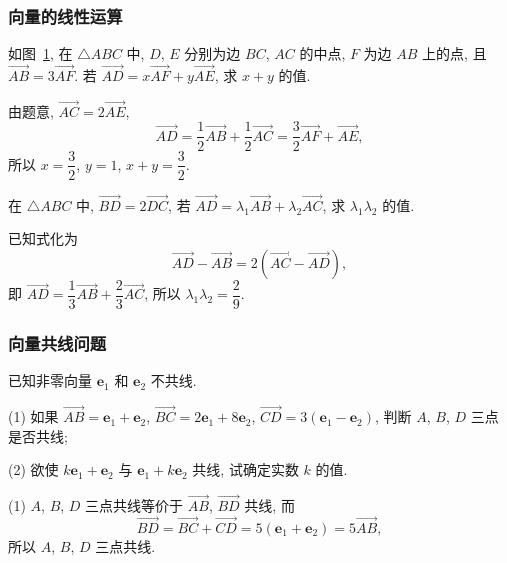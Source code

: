 \subsubsection{向量的线性运算}
\begin{example}
    如图~\ref{fig-190626-1845}, 在 $\triangle ABC$ 中, $D$, $E$ 分别为边 $BC$, $AC$ 的中点, $F$ 为边 $AB$ 上的点, 且 $\overrightarrow{AB} =3\overrightarrow{AF}$. 若 $\overrightarrow{AD}=x \overrightarrow{AF}+y \overrightarrow{AE}$, 求 $x+y$ 的值.
    \begin{figure}[htb]
    \small
    \centering
    \caption{}\label{fig-190626-1845}
    \end{figure}
\end{example}
\beginsolution
    由题意, $\overrightarrow{AC}= 2\overrightarrow{AE}$,
    \[\overrightarrow{AD}
        = \frac12\overrightarrow{AB}+ \frac12\overrightarrow{AC}
        = \frac32\overrightarrow{AF}+ \overrightarrow{AE},\]
    所以 $x=\dfrac32$, $y=1$, $x+y= \dfrac32$.
\endsolution

\lianxi
\begin{exercise}[s]
    在 $\triangle ABC$ 中, $\overrightarrow{BD}=2\overrightarrow{DC}$,
    若 $\overrightarrow{AD}=\lambda_1 \overrightarrow{AB}
      +\lambda_2 \overrightarrow{AC}$, 求 $\lambda_1 \lambda_2$ 的值.
\end{exercise}
\beginsolution
    已知式化为 
    \[\overrightarrow{AD}- \overrightarrow{AB}
        = 2(\overrightarrow{AC}- \overrightarrow{AD}),\]
    即 $\overrightarrow{AD}= \dfrac13\overrightarrow{AB}+ \dfrac23\overrightarrow{AC}$, 所以 $\lambda_1\lambda_2= \dfrac29$. 
\endsolution

\subsubsection{向量共线问题}

\begin{example}
    已知非零向量 $\bm{e}_1$ 和 $\bm{e}_2$ 不共线.
    
    (1) 如果 $\overrightarrow{AB}=\bm{e}_1 +\bm{e}_2$,
    $\overrightarrow{BC}=2\bm{e}_1 +8\bm{e}_2$, 
    $\overrightarrow{CD}=3(\bm{e}_1 -\bm{e}_2)$, 
    判断 $A$, $B$, $D$ 三点是否共线;
    
    (2) 欲使 $k\bm{e}_1 +\bm{e}_2$ 与 $\bm{e}_1 +k\bm{e}_2$ 共线,
    试确定实数 $k$ 的值.
\end{example}
\beginsolution
    (1) $A$, $B$, $D$ 三点共线等价于 $\overrightarrow{AB}$, $\overrightarrow{BD}$ 共线, 而
    \[\overrightarrow{BD}
        = \overrightarrow{BC}+ \overrightarrow{CD}
        = 5(\bm{e}_1+ \bm{e}_2)
        = 5\overrightarrow{AB},\]
    所以 $A$, $B$, $D$ 三点共线.

